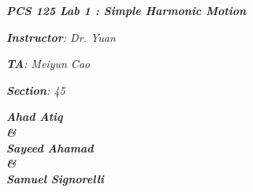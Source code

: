 

\begin{titlepage}
    \begin{center}
        \vspace*{1cm}
            
        \date{}
            
        \huge
            
        \textit{\textbf{PCS 125 Lab 1 : Simple Harmonic Motion}}
            
        \vspace{0.25cm}
            
            
            
		\vspace{0.25cm}
            
            
        \LARGE
            

		\textit{\textbf{Instructor}: Dr. Yuan}

		\textit{\textbf{TA}: Meiyun Cao}

		\textit{\textbf{Section}: 45}

		\vspace{2.5cm}

		\textit{\textbf{Ahad Atiq \\ \& \\ Sayeed Ahamad \\ \& \\ Samuel Signorelli}}
            
            
        \Large         

		\vspace{5cm}

		\vspace{0cm}            
            
		\Large		
		        
		

\end{center}
\end{titlepage}
